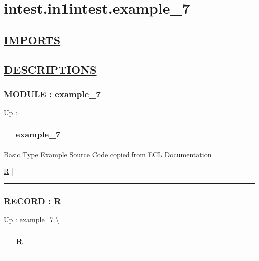 \chapter*{intest.in1intest.example\_7}
\hypertarget{ecldoc:toc:intest.in1intest.example_7}{}

\section*{\underline{IMPORTS}}

\section*{\underline{DESCRIPTIONS}}
\subsection*{MODULE : example\_7}
\hypertarget{ecldoc:intest.in1intest.example_7}{}
\hyperlink{ecldoc:toc:intest/in1intest}{Up} :

{\renewcommand{\arraystretch}{1.5}
\begin{tabularx}{\textwidth}{|>{\raggedright\arraybackslash}l|X|}
\hline
\hspace{0pt} & example\_7 \\
\hline
\end{tabularx}
}

\par
Basic Type Example Source Code copied from ECL Documentation


\hyperlink{ecldoc:intest.in1intest.example_7.r}{R}  |

\rule{\linewidth}{0.5pt}

\subsection*{RECORD : R}
\hypertarget{ecldoc:intest.in1intest.example_7.r}{}
\hyperlink{ecldoc:intest.in1intest.example_7}{Up} :
\hspace{0pt} \hyperlink{ecldoc:intest.in1intest.example_7}{example_7} \textbackslash 

{\renewcommand{\arraystretch}{1.5}
\begin{tabularx}{\textwidth}{|>{\raggedright\arraybackslash}l|X|}
\hline
\hspace{0pt} & R \\
\hline
\end{tabularx}
}

\par


\rule{\linewidth}{0.5pt}


